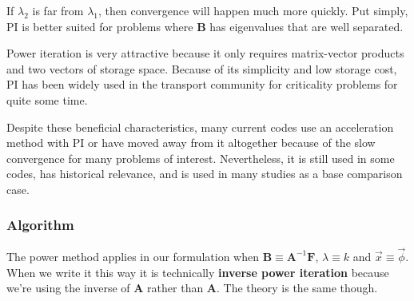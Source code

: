 \documentclass[12pt]{article}
\newcommand{\ve}[1]{\ensuremath{\mathbf{#1}}}
\begin{document}
If $\lambda_2$ is far from $\lambda_1$, then convergence will happen much more quickly. Put simply, PI is better suited for problems where $\ve{B}$ has eigenvalues that are well separated.  

Power iteration is very attractive because it only requires matrix-vector products and two vectors of storage space. Because of its simplicity and low storage cost, PI has been widely used in the transport community for criticality problems for quite some time.

Despite these beneficial characteristics, many current codes use an acceleration method with PI or have moved away from it altogether because of the slow convergence for many problems of interest. Nevertheless, it is still used in some codes, has historical relevance, and is used in many studies as a base comparison case.


\subsubsection*{Algorithm}

The power method applies in our formulation when $\ve{B} \equiv \ve{A}^{-1}\ve{F}$, $\lambda \equiv k$ and $\vec{x} \equiv \vec{\phi}$. 
%
When we write it this way it is technically \textbf{inverse power iteration} because we're using the inverse of $\ve{A}$ rather than $\ve{A}$. The theory is the same though.
\end{document}
